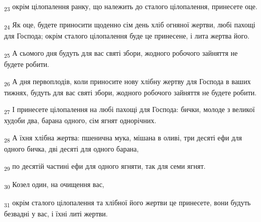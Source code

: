 \begin{tcolorbox}
\textsubscript{23} окрім цілопалення ранку, що належить до сталого цілопалення, принесете оце.
\end{tcolorbox}
\begin{tcolorbox}
\textsubscript{24} Як оце, будете приносити щоденно сім день хліб огняної жертви, любі пахощі для Господа; окрім сталого цілопалення буде це принесене, і лита жертва його.
\end{tcolorbox}
\begin{tcolorbox}
\textsubscript{25} А сьомого дня будуть для вас святі збори, жодного робочого зайняття не будете робити.
\end{tcolorbox}
\begin{tcolorbox}
\textsubscript{26} А дня первоплодів, коли приносите нову хлібну жертву для Господа в ваших тижнях, будуть для вас святі збори, жодного робочого зайняття не будете робити.
\end{tcolorbox}
\begin{tcolorbox}
\textsubscript{27} І принесете цілопалення на любі пахощі для Господа: бички, молоде з великої худоби два, барана одного, сім ягнят однорічних.
\end{tcolorbox}
\begin{tcolorbox}
\textsubscript{28} А їхня хлібна жертва: пшенична мука, мішана в оливі, три десяті ефи для одного бичка, дві десяті для одного барана,
\end{tcolorbox}
\begin{tcolorbox}
\textsubscript{29} по десятій частині ефи для одного ягняти, так для семи ягнят.
\end{tcolorbox}
\begin{tcolorbox}
\textsubscript{30} Козел один, на очищення вас,
\end{tcolorbox}
\begin{tcolorbox}
\textsubscript{31} окрім сталого цілопалення та хлібної його жертви це принесете, вони будуть безвадні у вас, і їхні литі жертви.
\end{tcolorbox}
